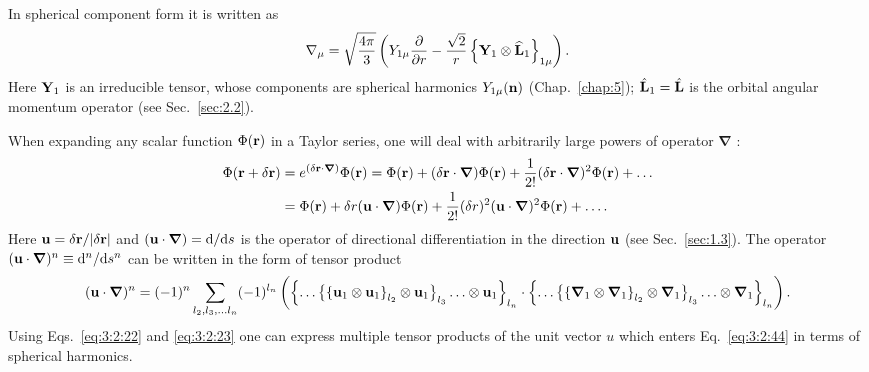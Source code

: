 In spherical component form it is written as
\begin{equation}
\nabla_{\mu}=\sqrt{\frac{4 \pi}{3}}\left(Y_{1 \mu} \frac{\partial}{\partial r}-\frac{\sqrt{2}}{r}\left\{\mathbf{Y}_{1} \otimes \widehat{\mathbf{L}}_{1}\right\}_{1 \mu}\right) .\label{eq:3:2:42}
\end{equation}
Here $\mathbf{Y}_{1}$ is an irreducible tensor, whose components are spherical harmonics $Y_{1 \mu}(\mathbf{n})$ (Chap.~\ref{chap:5}); $\hat{\mathbf{L}}_{1}=\hat{\mathbf{L}}$ is the orbital angular momentum operator (see Sec.~\ref{sec:2.2}).

When expanding any scalar function $\Phi(\mathbf{r})$ in a Taylor series, one will deal with arbitrarily large powers of operator $\boldsymbol{\nabla}$ :
\begin{align}
\Phi(\mathbf{r}+\delta \mathbf{r}) & =e^{(\delta \mathbf{r} \cdot \boldsymbol{\nabla})} \Phi(\mathbf{r})=\Phi(\mathbf{r})+(\delta \mathbf{r} \cdot \boldsymbol{\nabla}) \Phi(\mathbf{r})+\frac{1}{2!}(\delta \mathbf{r} \cdot \boldsymbol{\nabla})^{2} \Phi(\mathbf{r})+\ldots  \notag\\
& =\Phi(\mathbf{r})+\delta r(\mathbf{u} \cdot \boldsymbol{\nabla}) \Phi(\mathbf{r})+\frac{1}{2!}(\delta r)^{2}(\mathbf{u} \cdot \boldsymbol{\nabla})^{2} \Phi(\mathbf{r})+\ldots .\label{eq:3:2:43}
\end{align}
Here $\mathbf{u}=\delta \mathbf{r} /|\delta \mathbf{r}|$ and $(\mathbf{u} \cdot \boldsymbol{\nabla})=\mathrm{d} / \mathrm{d} s$ is the operator of directional differentiation in the direction $\mathbf{u}$ (see Sec.~\ref{sec:1.3}). The operator $(\mathbf{u} \cdot \boldsymbol{\nabla})^{n} \equiv \mathrm{d}^{n} / \mathrm{d} s^{n}$ can be written in the form of tensor product
\begin{equation}
(\mathbf{u} \cdot \boldsymbol{\nabla})^{n}=(-1)^{n} \sum_{l_{2}, l_{3}, \ldots l_{n}}(-1)^{l_{n}}\left(\left\{\ldots\left\{\left\{\mathbf{u}_{1} \otimes \mathbf{u}_{1}\right\}_{l_{2}} \otimes \mathbf{u}_{1}\right\}_{l_{3}} \ldots \otimes \mathbf{u}_{1}\right\}_{l_{n}} \cdot\left\{\ldots\left\{\left\{\boldsymbol{\nabla}_{1} \otimes \boldsymbol{\nabla}_{1}\right\}_{l_{2}} \otimes \boldsymbol{\nabla}_{1}\right\}_{l_{3}} \ldots \otimes \boldsymbol{\nabla}_{1}\right\}_{l_{n}}\right) .\label{eq:3:2:44}
\end{equation}
Using Eqs.~\eqref{eq:3:2:22} and \eqref{eq:3:2:23} one can express multiple tensor products of the unit vector $u$ which enters Eq.~\eqref{eq:3:2:44} in terms of spherical harmonics.

